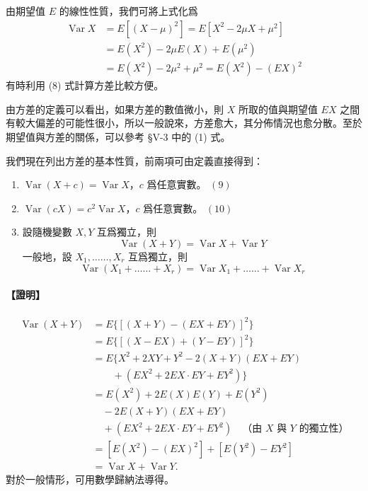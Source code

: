 由期望值 $E$ 的線性性質，我們可將上式化爲
\begin{align}
\operatorname{Var} X &= E[(X-\mu)^2] = E[X^2 - 2\mu X + \mu^2] \nonumber \\
&= E(X^2) - 2\mu E(X) + E(\mu^2) \nonumber \\
&= E(X^2) - 2\mu^2 + \mu^2 = E(X^2) - (EX)^2 \tag{8}\label{eq:b5-5-2-8}
\end{align}
有時利用 (8) 式計算方差比較方便。

由方差的定義可以看出，如果方差的數值微小，則 $X$ 所取的值與期望值 $EX$ 之間有較大偏差的可能性很小，所以一般說來，方差愈大，其分佈情況也愈分散。至於期望值與方差的關係，可以參考 §V-3 中的 (1) 式。

我們現在列出方差的基本性質，前兩項可由定義直接得到：
\begin{enumerate}[label=\arabic*., leftmargin=2em, itemsep=0.3em]
  \item $\operatorname{Var}(X+c) = \operatorname{Var} X$，$c$ 爲任意實數。 \hfill $(9)$\label{eq:b5-5-2-9}
  \item $\operatorname{Var}(cX) = c^2 \operatorname{Var} X$，$c$ 爲任意實數。 \hfill $(10)$\label{eq:b5-5-2-10}
  \item 設隨機變數 $X, Y$ 互爲獨立，則
  \begin{equation}\tag{11}\label{eq:b5-5-2-11}
  \operatorname{Var}(X+Y) = \operatorname{Var} X + \operatorname{Var} Y
  \end{equation}
  一般地，設 $X_1, \ldots\ldots, X_r$ 互爲獨立，則
  \begin{equation}\tag{12}\label{eq:b5-5-2-12}
  \operatorname{Var}(X_1 + \ldots\ldots + X_r) = \operatorname{Var} X_1 + \ldots\ldots + \operatorname{Var} X_r
  \end{equation}
\end{enumerate}

\medskip
\paragraph{【證明】}
\begin{align*}
\operatorname{Var}(X+Y) &= E\{[(X+Y)-(EX+EY)]^2\} \\
&= E\{[(X-EX)+(Y-EY)]^2\} \\
&= E\{X^2 + 2XY + Y^2 - 2(X+Y)(EX+EY) \\
&\qquad + (EX^2 + 2EX \cdot EY + EY^2)\} \\
&= E(X^2) + 2E(X)E(Y) + E(Y^2) \\
&\quad - 2E(X+Y)(EX+EY) \\
&\quad + (EX^2 + 2EX \cdot EY + EY^2) \quad \text{（由 $X$ 與 $Y$ 的獨立性）} \\
&= [E(X^2) - (EX)^2] + [E(Y^2) - EY^2] \\
&= \operatorname{Var} X + \operatorname{Var} Y.
\end{align*}
對於一般情形，可用數學歸納法導得。

